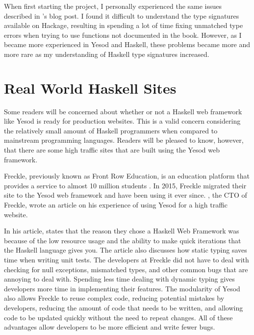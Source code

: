 When first starting the project, I personally experienced the same issues described
in \citeauthor{beginnerYesod}'s blog post. I found it difficult to understand the type
signatures available on Hackage, resulting in spending a lot of time fixing
unmatched type errors when trying to use functions not documented in the book.
However, as I became more experienced in Yesod and Haskell, these problems
became more and more rare as my understanding of Haskell type signatures increased.

\section{Real World Haskell Sites}

Some readers will be concerned about whether or not a Haskell web framework like
Yesod is ready for production websites. This is a valid concern considering the
relatively small amount of Haskell programmers when compared to mainstream 
programming languages. Readers will be pleased to know, however, that there
are some high traffic sites that are built using the Yesod web framework.

Freckle, previously known as Front Row Education, is an education
platform that provides a service to almost 10 million students \parencite{frontrowName}. 
In 2015, Freckle migrated their site to the Yesod web framework and have been 
using it ever since. \citeauthor{frontrow}, the CTO of Freckle, wrote an article
on his experience of using Yesod for a high traffic website. \parencite{frontrow}

In his article, \citeauthor{frontrow} states that the reason they chose a Haskell
Web Framework was because of the low resource usage and the ability to make
quick iterations that the Haskell language gives you. The article also discusses
how static typing saves time when writing unit tests. The developers at Freckle
did not have to deal with checking for null exceptions, mismatched types, and
other common bugs that are annoying to deal with. Spending less time dealing with
dynamic typing gives developers more time in implementing their features. The
modularity of Yesod also allows Freckle to reuse complex code, reducing potential
mistakes by developers, reducing the amount of code that needs to be written,
and allowing code to be updated quickly without the need to repeat changes. All
of these advantages allow developers to be more efficient and write fewer bugs. \parencite{frontrow}

